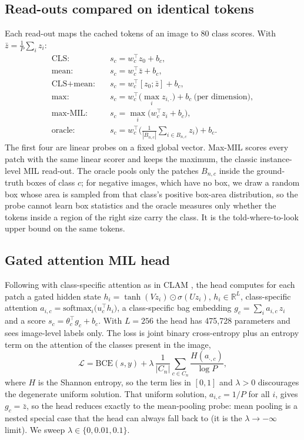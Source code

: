 \documentclass[10pt,letterpaper,twocolumn]{article}
\begin{document}
\subsection{Read-outs compared on identical tokens}
Each read-out maps the cached tokens of an image to 80 class scores. With $\bar z =
\frac{1}{P}\sum_i z_i$:
\begin{align*}
\text{CLS:}&\quad s_c = w_c^{\top} z_0 + b_c,\\
\text{mean:}&\quad s_c = w_c^{\top} \bar z + b_c,\\
\text{CLS+mean:}&\quad s_c = w_c^{\top} [z_0;\bar z] + b_c,\\
\text{max:}&\quad s_c = w_c^{\top} \big(\max_i z_{i,\cdot}\big) + b_c \ \text{(per dimension)},\\
\text{max-MIL:}&\quad s_c = \max_i \big(w_c^{\top} z_i + b_c\big),\\
\text{oracle:}&\quad s_c = w_c^{\top}\Big(\tfrac{1}{|B_{n,c}|}\textstyle\sum_{i\in B_{n,c}} z_i\Big) + b_c .
\end{align*}
The first four are linear probes on a fixed global vector. Max-MIL scores every patch with the
same linear scorer and keeps the maximum, the classic instance-level MIL read-out. The oracle
pools only the patches $B_{n,c}$ inside the ground-truth boxes of class $c$; for negative
images, which have no box, we draw a random box whose area is sampled from that class's
positive box-area distribution, so the probe cannot learn box statistics and the oracle
measures only whether the tokens inside a region of the right size carry the class. It is the
told-where-to-look upper bound on the same tokens.

\subsection{Gated attention MIL head}
Following \citet{ilse2018attention} with class-specific attention as in CLAM
\citep{lu2021clam}, the head computes for each patch a gated hidden state
$h_i = \tanh(Vz_i)\odot\sigma(Uz_i)$, $h_i\in\mathbb{R}^{L}$, class-specific attention
$a_{i,c} = \mathrm{softmax}_i\big(u_c^{\top} h_i\big)$, a class-specific bag embedding
$g_c=\sum_i a_{i,c}\, z_i$ and a score $s_c = \theta_c^{\top} g_c + b_c$. With $L=256$ the
head has 475,728 parameters and sees image-level labels only. The loss is joint binary
cross-entropy plus an entropy term on the attention of the classes present in the image,
\begin{equation*}
\mathcal{L} = \mathrm{BCE}(s, y) + \lambda\,\frac{1}{|C_n|}\sum_{c\in C_n}\frac{H(a_{\cdot,c})}{\log P},
\end{equation*}
where $H$ is the Shannon entropy, so the term lies in $[0,1]$ and $\lambda>0$ discourages the
degenerate uniform solution. That uniform solution, $a_{i,c}=1/P$ for all $i$, gives
$g_c=\bar z$, so the head reduces exactly to the mean-pooling probe: mean pooling is a nested
special case that the head can always fall back to (it is the $\lambda\to-\infty$ limit). We
sweep $\lambda\in\{0, 0.01, 0.1\}$.
\end{document}
